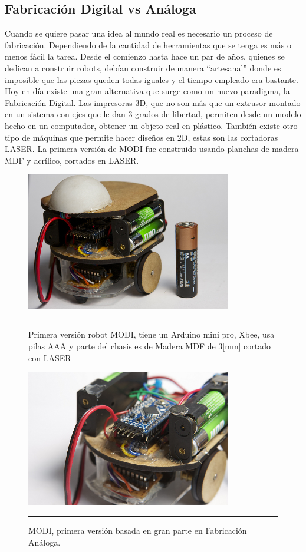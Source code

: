 \subsection{Fabricación Digital vs Análoga}
Cuando se quiere pasar una idea al mundo real es necesario un proceso de fabricación. Dependiendo de la cantidad de herramientas que se tenga es más o menos fácil la tarea. Desde el comienzo hasta hace un par de años, quienes se dedican a construir robots, debían construir de manera “artesanal” donde es imposible que las piezas queden todas iguales y el tiempo empleado era bastante. Hoy en día existe una gran alternativa que surge como un nuevo paradigma, la Fabricación Digital. Las impresoras 3D, que no son más que un extrusor montado en un sistema con ejes que le dan 3 grados de libertad, permiten desde un modelo hecho en un computador, obtener un objeto real en plástico. También existe otro tipo de máquinas que permite hacer diseños en 2D, estas son las cortadoras LASER. La primera versión de MODI fue construido usando planchas de madera MDF y acrílico, cortados en LASER.

\begin{figure}[htbp]
	\centering
		\includegraphics[width=0.8\textwidth]{./Pictures/MODIrev1.jpg}
		\rule{35em}{0.5pt}
	\caption[modi]{Primera versión robot MODI, tiene un Arduino mini pro, Xbee, usa pilas AAA y parte del chasis es de Madera MDF de 3[mm] cortado con LASER}
	\label{fig:modi1}
\end{figure}

\begin{figure}[htbp]
	\centering
		\includegraphics[width=0.8\textwidth]{./Pictures/2MODIrev1.jpg}
		\rule{35em}{0.5pt}
	\caption[modi2]{MODI, primera versión basada en gran parte en Fabricación Análoga.}
	\label{fig:modi2}
\end{figure}

